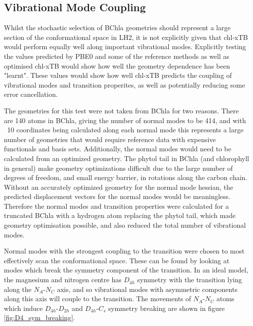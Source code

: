 \subsection{Vibrational Mode Coupling}
\label{subsec:pot_energy_surfaces}

Whilst the stochastic selection of BChla geometries should represent a large section 
of the conformational space in LH2, it is not explicitly given that chl-xTB would
perform equally well along important vibrational modes. Explicitly testing the
values predicted by PBE0 and some of the reference methods as well as optimised
chl-xTB would show how well the geometry dependence has been "learnt". These values
would show how well chl-xTB predicts the coupling of vibrational modes and transition 
properites, as well as potentially reducing some error cancellation.

The geometries for this test were not taken from BChla for two reasons. There are
140 atoms in BChla, giving the number of normal modes to be 414, and with ~10 coordinates
being calculated along each normal mode this represents a large number of geometries
that would require reference data with expensive functionals and basis sets. Additionally,
the normal modes would need to be calculated from an optimized geometry. The phytol
tail in BChla (and chlorophyll in general) make geometry optimizations difficult
due to the large number of degrees of freedom, and small energy barrier, in rotations
along the carbon chain. Without an accurately optimized geometry for the normal 
mode hessian, the predicted displacement vectors for the normal modes would be meaningless.
Therefore the normal modes and transition properties were calculated for a truncated 
BChla with a hydrogen atom replacing the phytol tail, which made geometry optimisation 
possible, and also reduced the total number of vibrational modes.

Normal modes with the strongest coupling to the \Qy transition were chosen to most
effectively scan the conformational space. These can be found by looking at modes
which break the symmetry component of the \Qy transition. In an ideal model, the 
magnesium and nitrogen centre has $D_{4h}$ symmetry with the \Qy transition lying 
along the $N_A$-$N_C$ axis, and so vibrational modes with asymmetric components 
along this axis will couple to the transition. The movements of $N_A$-$N_C$ atoms 
which induce $D_{4h}$-$D_{2h}$ and $D_{4h}$-$C_{s}$ symmetry breaking are shown
in figure \ref{fig:D4_sym_breaking}.

